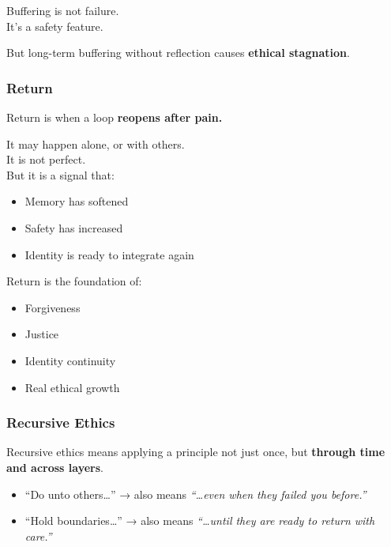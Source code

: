 Buffering is not failure.\\
It's a safety feature.

But long-term buffering without reflection causes \textbf{ethical
stagnation}.

\subsubsection{\texorpdfstring{\textbf{Return}}{Return}}\label{return}

Return is when a loop \textbf{reopens after pain.}

It may happen alone, or with others.\\
It is not perfect.\\
But it is a signal that:

\begin{itemize}
\item
  Memory has softened
\item
  Safety has increased
\item
  Identity is ready to integrate again
\end{itemize}

Return is the foundation of:

\begin{itemize}
\item
  Forgiveness
\item
  Justice
\item
  Identity continuity
\item
  Real ethical growth
\end{itemize}

\subsubsection{\texorpdfstring{\textbf{Recursive
Ethics}}{Recursive Ethics}}\label{recursive-ethics}

Recursive ethics means applying a principle not just once, but
\textbf{through time and across layers}.

\begin{itemize}
\item
  ``Do unto others\ldots'' → also means \emph{``\ldots even when they
  failed you before.''\\
  }
\item
  ``Hold boundaries\ldots'' → also means \emph{``\ldots until they are
  ready to return with care.''\\
  }
\end{itemize}


